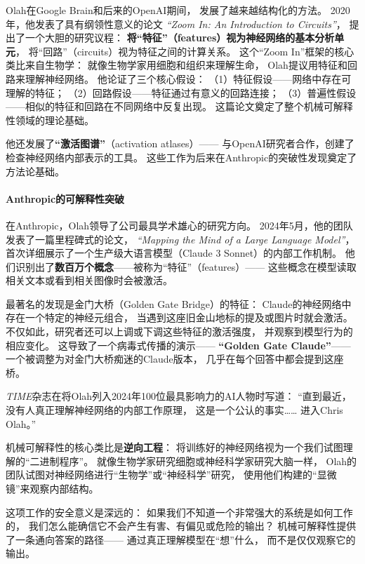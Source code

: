 Olah在Google Brain和后来的OpenAI期间，
发展了越来越结构化的方法。
2020年，他发表了具有纲领性意义的论文
\textit{``Zoom In: An Introduction to Circuits''}，
提出了一个大胆的研究议程：
\textbf{将``特征''（features）视为神经网络的基本分析单元}，
将``回路''（circuits）视为特征之间的计算关系。
这个``Zoom In''框架的核心类比来自生物学：
就像生物学家用细胞和组织来理解生命，
Olah提议用特征和回路来理解神经网络。
他论证了三个核心假设：
（1）特征假设——网络中存在可理解的特征；
（2）回路假设——特征通过有意义的回路连接；
（3）普遍性假设——相似的特征和回路在不同网络中反复出现。
这篇论文奠定了整个机械可解释性领域的理论基础。

他还发展了\textbf{``激活图谱''}（activation atlases）——
与OpenAI研究者合作，创建了检查神经网络内部表示的工具。
这些工作为后来在Anthropic的突破性发现奠定了方法论基础。

\paragraph{Anthropic的可解释性突破}
在Anthropic，Olah领导了公司最具学术雄心的研究方向。
2024年5月，他的团队发表了一篇里程碑式的论文，
\textit{``Mapping the Mind of a Large Language Model''}，
首次详细展示了一个生产级大语言模型（Claude 3 Sonnet）的内部工作机制。
他们识别出了\textbf{数百万个概念}——被称为``特征''（features）——
这些概念在模型读取相关文本或看到相关图像时会被激活。

最著名的发现是金门大桥（Golden Gate Bridge）的特征：
Claude的神经网络中存在一个特定的神经元组合，
当遇到这座旧金山地标的提及或图片时就会激活。
不仅如此，研究者还可以上调或下调这些特征的激活强度，
并观察到模型行为的相应变化。
这导致了一个病毒式传播的演示——
\textbf{``Golden Gate Claude''}——
一个被调整为对金门大桥痴迷的Claude版本，
几乎在每个回答中都会提到这座桥。

\textit{TIME}杂志在将Olah列入2024年100位最具影响力的AI人物时写道：
``直到最近，没有人真正理解神经网络的内部工作原理，
这是一个公认的事实……
进入Chris Olah。''

\begin{keybox}
机械可解释性的核心类比是\textbf{逆向工程}：
将训练好的神经网络视为一个我们试图理解的``二进制程序''。
就像生物学家研究细胞或神经科学家研究大脑一样，
Olah的团队试图对神经网络进行``生物学''或``神经科学''研究，
使用他们构建的``显微镜''来观察内部结构。

这项工作的安全意义是深远的：
如果我们不知道一个非常强大的系统是如何工作的，
我们怎么能确信它不会产生有害、有偏见或危险的输出？
机械可解释性提供了一条通向答案的路径——
通过真正理解模型在``想''什么，
而不是仅仅观察它的输出。
\end{keybox}

